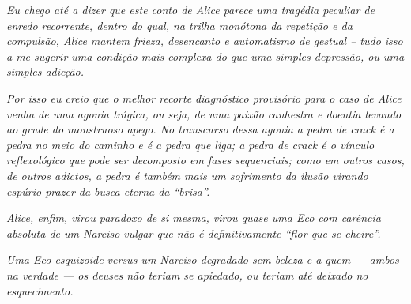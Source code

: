 \emph{Eu chego até a dizer que este conto de Alice parece uma tragédia
peculiar de enredo recorrente, dentro do qual, na trilha monótona da
repetição e da compulsão, Alice mantem frieza, desencanto e automatismo
de gestual -- tudo isso a me sugerir uma condição mais complexa do que
uma simples depressão, ou uma simples adicção.}

\emph{Por isso eu creio que o melhor recorte diagnóstico provisório para
o caso de Alice venha de uma agonia trágica, ou seja, de uma paixão
canhestra e doentia levando ao grude do monstruoso apego. No transcurso
dessa agonia a pedra de crack é a pedra no meio do caminho e é a pedra
que liga; a pedra de crack é o vínculo reflexológico que pode ser
decomposto em fases sequenciais; como em outros casos, de outros
adictos, a pedra é também mais um sofrimento da ilusão virando espúrio
prazer da busca eterna da ``brisa''.}~

\emph{Alice, enfim, virou paradoxo de si mesma, virou quase uma Eco com
carência absoluta de um Narciso vulgar que não é definitivamente ``flor
que se cheire''.}~

\emph{Uma Eco esquizoide versus um Narciso degradado sem beleza e a quem
--- ambos na verdade --- os deuses não teriam se apiedado, ou teriam até
deixado no esquecimento. ~}~
